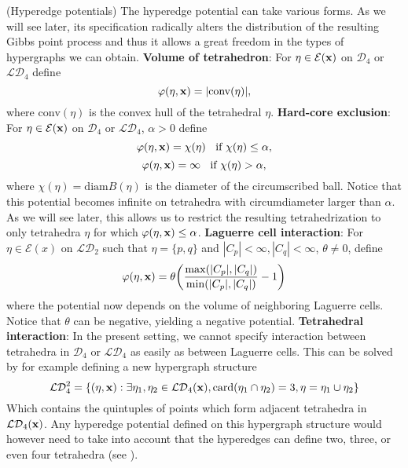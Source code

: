 \begin{ex}\label{ex:potentials}(Hyperedge potentials)
	The hyperedge potential can take various forms. As we will see later, its specification radically alters the distribution of the resulting Gibbs point process and thus it allows a great freedom in the types of hypergraphs we can obtain.\newline
	\textbf{Volume of tetrahedron}: For $\eta\in\mathcal E({\mathbf{x}})$ on $\mathcal D_4$ or $\mathcal {LD}_4$ define
	$$\varphi(\eta,{\mathbf{x}}) = |\mathrm{conv}(\eta)| ,$$
	where $\mathrm{conv}(\eta)$ is the convex hull of the tetrahedral $\eta$.	\newline
	\textbf{Hard-core exclusion}: For $\eta\in\mathcal E({\mathbf{x}})$ on $\mathcal D_4$ or $\mathcal {LD}_4$, $\alpha >0$ define
	$$\varphi(\eta,{\mathbf{x}}) = \chi(\eta)\;\; \text{ if } \chi(\eta) \leq \alpha,$$
	$$\varphi(\eta,{\mathbf{x}}) = \infty \;\; \text { if } \chi(\eta) > \alpha,$$
	where $\chi(\eta)= \mathrm{diam}B(\eta)$ is the diameter of the circumscribed ball. Notice that this potential becomes infinite on tetrahedra with circumdiameter larger than $\alpha$. As we will see later, this allows us to restrict the resulting tetrahedrization to only tetrahedra $\eta$ for which $\varphi(\eta,{\mathbf{x}}) \leq \alpha$.\newline
	\textbf{Laguerre cell interaction}: For $\eta \in \mathcal E(x)$ on $\mathcal {LD}_2$ such that $\eta=\{p,q\}$ and $|C_p| < \infty, |C_q| < \infty$, $\theta \neq 0$, define
$$\varphi(\eta,{\mathbf{x}}) = \theta \bigg (\frac {\max ( |C_p|, |C_q|)}{\min(|C_p|,|C_q|)} - 1\bigg)$$
where the potential now depends on the volume of neighboring Laguerre cells. Notice that $\theta$ can be negative, yielding a negative potential. \newline
\textbf{Tetrahedral interaction}: In the present setting, we cannot specify interaction between tetrahedra in $\mathcal D_4$ or $\mathcal {LD}_4$ as easily as between Laguerre cells. This can be solved by for example defining a new hypergraph structure
$$\mathcal {LD}^2_4 = \{(\eta,{\mathbf{x}}): \exists \eta_1,\eta_2\in\mathcal {LD}_4({\mathbf{x}}), \mathrm{card}(\eta_1 \cap \eta_2)=3, \eta = \eta_1 \cup \eta_2\}$$
Which contains the quintuples of points which form adjacent tetrahedra in $\mathcal {LD}_4({\mathbf{x}})$. Any hyperedge potential defined on this hypergraph structure would however need to take into account that the hyperedges can define two, three, or even four tetrahedra (see \cite{Joe91}).
\end{ex}

